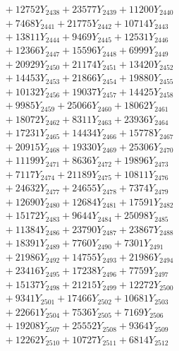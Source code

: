 \documentclass[a4paper,10pt]{article}
\begin{document}
{\begin{align}
&\;  + 12752 Y_{2438} + 23577 Y_{2439} + 11200 Y_{2440} \\[0.3ex]
&\;  + 7468 Y_{2441} + 21775 Y_{2442} + 10714 Y_{2443} \\[0.3ex]
&\;  + 13811 Y_{2444} + 9469 Y_{2445} + 12531 Y_{2446} \\[0.3ex]
&\;  + 12366 Y_{2447} + 15596 Y_{2448} + 6999 Y_{2449} \\[0.3ex]
&\;  + 20929 Y_{2450} + 21174 Y_{2451} + 13420 Y_{2452} \\[0.3ex]
&\;  + 14453 Y_{2453} + 21866 Y_{2454} + 19880 Y_{2455} \\[0.3ex]
&\;  + 10132 Y_{2456} + 19037 Y_{2457} + 14425 Y_{2458} \\[0.5ex]\allowbreak
&\;  + 9985 Y_{2459} + 25066 Y_{2460} + 18062 Y_{2461} \\[0.3ex]
&\;  + 18072 Y_{2462} + 8311 Y_{2463} + 23936 Y_{2464} \\[0.3ex]
&\;  + 17231 Y_{2465} + 14434 Y_{2466} + 15778 Y_{2467} \\[0.3ex]
&\;  + 20915 Y_{2468} + 19330 Y_{2469} + 25306 Y_{2470} \\[0.3ex]
&\;  + 11199 Y_{2471} + 8636 Y_{2472} + 19896 Y_{2473} \\[0.3ex]
&\;  + 7117 Y_{2474} + 21189 Y_{2475} + 10811 Y_{2476} \\[0.3ex]
&\;  + 24632 Y_{2477} + 24655 Y_{2478} + 7374 Y_{2479} \\[0.3ex]
&\;  + 12690 Y_{2480} + 12684 Y_{2481} + 17591 Y_{2482} \\[0.3ex]
&\;  + 15172 Y_{2483} + 9644 Y_{2484} + 25098 Y_{2485} \\[0.3ex]
&\;  + 11384 Y_{2486} + 23790 Y_{2487} + 23867 Y_{2488} \\[0.5ex]\allowbreak
&\;  + 18391 Y_{2489} + 7760 Y_{2490} + 7301 Y_{2491} \\[0.3ex]
&\;  + 21986 Y_{2492} + 14755 Y_{2493} + 21986 Y_{2494} \\[0.3ex]
&\;  + 23416 Y_{2495} + 17238 Y_{2496} + 7759 Y_{2497} \\[0.3ex]
&\;  + 15137 Y_{2498} + 21215 Y_{2499} + 12272 Y_{2500} \\[0.3ex]
&\;  + 9341 Y_{2501} + 17466 Y_{2502} + 10681 Y_{2503} \\[0.3ex]
&\;  + 22661 Y_{2504} + 7536 Y_{2505} + 7169 Y_{2506} \\[0.3ex]
&\;  + 19208 Y_{2507} + 25552 Y_{2508} + 9364 Y_{2509} \\[0.3ex]
&\;  + 12262 Y_{2510} + 10727 Y_{2511} + 6814 Y_{2512} \\[0.3ex]

\end{align}}
\end{document}
